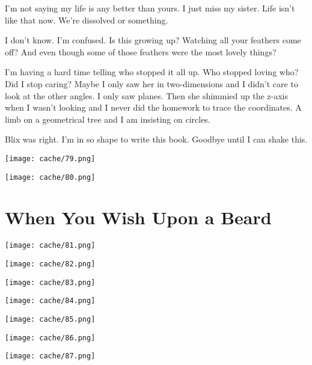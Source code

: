 \documentclass[12pt,twoside]{report}
\begin{document}
I'm not saying my life is any better than yours.  I just miss my
sister.  Life isn't like that now. We're dissolved or something.

I don't know.  I'm confused.  Is this growing up?  Watching all your
feathers come off?  And even though some of those feathers were the
most lovely things?

I'm having a hard time telling who stopped it all up.  Who stopped
loving who?  Did I stop caring?  Maybe I only saw her in
two-dimensions and I didn't care to look at the other angles.  I only
saw planes.  Then she shimmied up the z-axis when I wasn't looking and
I never did the homework to trace the coordinates.  A limb on a
geometrical tree and I am insisting on circles.

Blix was right.  I'm in so shape to write this book.  Goodbye until I
can shake this.

	\texttt{[image: cache/79.png]}

	\texttt{[image: cache/80.png]}

\newpage
\thispagestyle{empty}
\mbox{}
\newpage
\thispagestyle{empty}
\mbox{}
\cleartooddpage


\chapter{When You Wish Upon a Beard}

\vfill

\texttt{[image: cache/81.png]}

\newpage
\thispagestyle{empty}
\mbox{}
\clearpage


\vspace*{0.6cm} \texttt{[image: cache/82.png]}
\newpage

\vspace*{0.6cm} \texttt{[image: cache/83.png]}
\newpage

\vspace*{0.6cm} \texttt{[image: cache/84.png]}
\newpage

\vspace*{0.6cm} \texttt{[image: cache/85.png]}
\newpage

\vspace*{0.6cm} \texttt{[image: cache/86.png]}
\newpage

\vspace*{0.6cm} \texttt{[image: cache/87.png]}
\newpage
\end{document}
